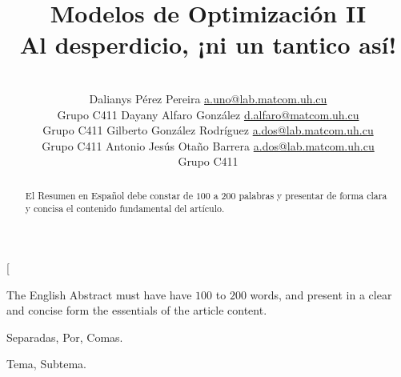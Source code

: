 \documentclass[a4paper,10pt,twocolumn]{article}
\title{Modelos de Optimización II \\
	Al desperdicio, ¡ni un tantico así!}
\author{\\
\name Dalianys Pérez Pereira \email \href{mailto:a.uno@lab.matcom.uh.cu}{a.uno@lab.matcom.uh.cu}
	\\ \addr Grupo C411 \AND
\name Dayany Alfaro González \email \href{mailto:d.alfaro@matcom.uh.cu}{d.alfaro@matcom.uh.cu}
  \\ \addr Grupo C411 \AND
\name Gilberto González Rodríguez \email \href{mailto:a.dos@lab.matcom.uh.cu}{a.dos@lab.matcom.uh.cu}
\\ \addr Grupo C411 \AND
\name Antonio Jesús Otaño Barrera \email \href{mailto:a.dos@lab.matcom.uh.cu}{a.dos@lab.matcom.uh.cu}
\\ \addr Grupo C411}
\begin{document}
\twocolumn[

\maketitle


\begin{abstract}

	El Resumen en Español debe constar de $100$ a $200$ palabras y presentar de forma
	clara y concisa el contenido fundamental del artículo.

\end{abstract}

\vspace{0.5cm}

\begin{enabstract}

  The English Abstract must have have $100$ to $200$ words, and present in a clear
  and concise form the essentials of the article content.

\end{enabstract}

\begin{keywords}
	Separadas,
	Por,
	Comas.
\end{keywords}

\begin{topics}
	Tema, Subtema.
\end{topics}
\end{document}
